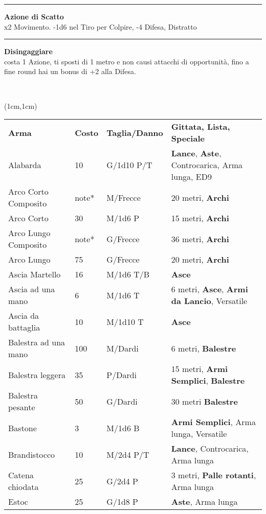 \documentclass[a4paper,12 pt,openany]{book}
\newcommand{\riga}{\rule{\textwidth}{0.4pt}}
\begin{document}
\begin{textblock*}{6.2cm}
\riga

\textbf{Azione di Scatto}\\
x2 Movimento. -1d6 nel Tiro per Colpire, -4 Difesa, Distratto

\riga

\textbf{Disingaggiare}\\
costa 1 Azione, ti sposti di 1 metro e non causi attacchi di opportunità, fino a fine round hai un bonus di +2 alla Difesa.

\end{textblock*}

~\newpage

\begin{textblock*}{19.5cm}(1cm,1cm) %

\begin{tabularx}{0.95\textwidth}{llll}
\textbf{Arma}&\textbf{Costo}&\textbf{Taglia/Danno} & \textbf{Gittata, Lista, Speciale}\\
Alabarda& 10 & G/1d10 P/T& \textbf{Lance}, \textbf{Aste}, Controcarica, Arma lunga, ED9 \\
Arco Corto Composito& note*& M/Frecce& 20 metri, \textbf{Archi}\\
Arco Corto& 30 & M/1d6 P& 15 metri, \textbf{Archi}\\
Arco Lungo Composito& note*& G/Frecce& 36 metri, \textbf{Archi}\\
Arco Lungo& 75 & G/Frecce& 20 metri, \textbf{Archi}\\
Ascia Martello& 16 & M/1d6 T/B& \textbf{Asce}\\
Ascia ad una mano& 6  & M/1d6 T& 6 metri, \textbf{Asce}, \textbf{Armi da Lancio}, Versatile\\
Ascia da battaglia& 10 & M/1d10 T&\textbf{Asce}\\
Balestra ad una mano& 100& M/Dardi& 6 metri, \textbf{Balestre}\\
Balestra leggera& 35 & P/Dardi& 15 metri, \textbf{Armi Semplici}, \textbf{Balestre}\\
Balestra pesante& 50 & G/Dardi& 30 metri \textbf{Balestre}\\
Bastone& 3& M/1d6 B& \textbf{Armi Semplici}, Arma lunga, Versatile\\
Brandistocco& 10 & M/2d4 P/T& \textbf{Lance}, Controcarica, Arma lunga\\
Catena chiodata& 25 & G/2d4 P& 3 metri, \textbf{Palle rotanti}, Arma lunga\\
Estoc& 25& G/1d8 P& \textbf{Aste}, Arma lunga\\

\end{tabularx}
\end{textblock*}
\end{document}
